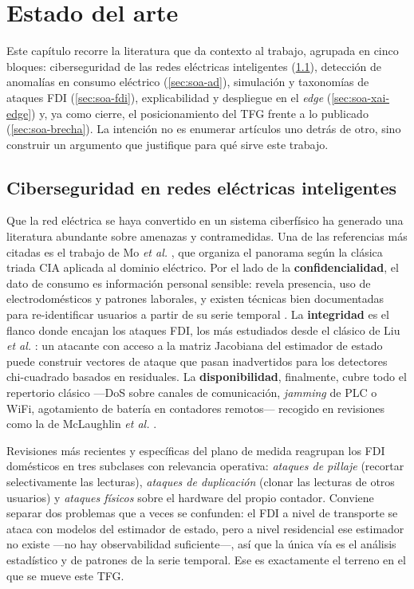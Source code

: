 \chapter{Estado del arte}
\label{cap:estado}

Este capítulo recorre la literatura que da contexto al trabajo, agrupada en cinco bloques: ciberseguridad de las redes eléctricas inteligentes (\cref{sec:soa-cyber}), detección de anomalías en consumo eléctrico (\cref{sec:soa-ad}), simulación y taxonomías de ataques FDI (\cref{sec:soa-fdi}), explicabilidad y despliegue en el \textit{edge} (\cref{sec:soa-xai-edge}) y, ya como cierre, el posicionamiento del TFG frente a lo publicado (\cref{sec:soa-brecha}). La intención no es enumerar artículos uno detrás de otro, sino construir un argumento que justifique para qué sirve este trabajo.

\section{Ciberseguridad en redes eléctricas inteligentes}
\label{sec:soa-cyber}

Que la red eléctrica se haya convertido en un sistema ciberfísico ha generado una literatura abundante sobre amenazas y contramedidas. Una de las referencias más citadas es el trabajo de Mo \emph{et al.} \cite{mo2012cyberphysical}, que organiza el panorama según la clásica triada CIA aplicada al dominio eléctrico. Por el lado de la \textbf{confidencialidad}, el dato de consumo es información personal sensible: revela presencia, uso de electrodomésticos y patrones laborales, y existen técnicas bien documentadas para re-identificar usuarios a partir de su serie temporal \cite{molina2010private}. La \textbf{integridad} es el flanco donde encajan los ataques FDI, los más estudiados desde el clásico de Liu \emph{et al.} \cite{liu2009fdi}: un atacante con acceso a la matriz Jacobiana del estimador de estado puede construir vectores de ataque que pasan inadvertidos para los detectores chi-cuadrado basados en residuales. La \textbf{disponibilidad}, finalmente, cubre todo el repertorio clásico ---DoS sobre canales de comunicación, \textit{jamming} de PLC o WiFi, agotamiento de batería en contadores remotos--- recogido en revisiones como la de McLaughlin \emph{et al.} \cite{mclaughlin2016cybersecurity}.

Revisiones más recientes y específicas del plano de medida \cite{mehrdad2018cybersecurity,liang2017review} reagrupan los FDI domésticos en tres subclases con relevancia operativa: \emph{ataques de pillaje} (recortar selectivamente las lecturas), \emph{ataques de duplicación} (clonar las lecturas de otros usuarios) y \emph{ataques físicos} sobre el hardware del propio contador. Conviene separar dos problemas que a veces se confunden: el FDI a nivel de transporte se ataca con modelos del estimador de estado, pero a nivel residencial ese estimador no existe ---no hay observabilidad suficiente---, así que la única vía es el análisis estadístico y de patrones de la serie temporal. Ese es exactamente el terreno en el que se mueve este TFG.

